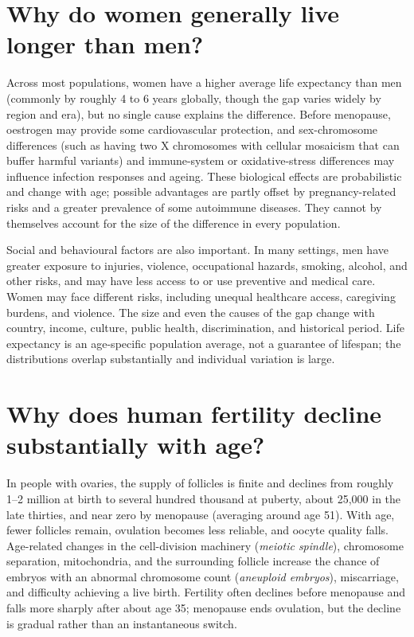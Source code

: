 \documentclass[11pt,oneside]{report}
\begin{document}
\section{Why do women generally live longer than men?}

Across most populations, women have a higher average life expectancy than men
(commonly by roughly 4 to 6 years globally, though the gap varies widely by
region and era), but no single cause explains the difference. Before menopause,
oestrogen may provide some cardiovascular protection, and sex-chromosome
differences (such as having two X chromosomes with cellular mosaicism that can
buffer harmful variants) and immune-system or oxidative-stress differences may
influence infection responses and ageing. These biological
effects are probabilistic and change with age; possible advantages are partly
offset by pregnancy-related risks and a greater prevalence of some autoimmune
diseases. They cannot by themselves account for the size of the difference in
every population.

Social and behavioural factors are also important. In many settings, men have
greater exposure to injuries, violence, occupational hazards, smoking, alcohol,
and other risks, and may have less access to or use preventive and medical care.
Women may face different risks, including unequal healthcare access, caregiving
burdens, and violence. The size and even the causes of the gap change with
country, income, culture, public health, discrimination, and historical
period. Life expectancy is an age-specific population average, not a guarantee
of lifespan; the distributions overlap substantially and individual variation
is large.

\section{Why does human fertility decline substantially with age?}

In people with ovaries, the supply of follicles is finite and declines from
roughly 1--2 million at birth to several hundred thousand at puberty, about
25,000 in the late thirties, and near zero by menopause (averaging around age
51). With age, fewer follicles remain, ovulation becomes less reliable, and
oocyte quality falls. Age-related changes in the cell-division machinery
(\emph{meiotic spindle}), chromosome separation, mitochondria, and the
surrounding follicle increase the chance of embryos with an abnormal chromosome
count (\emph{aneuploid embryos}), miscarriage, and difficulty achieving a live
birth. Fertility often declines before menopause and falls more sharply after
about age 35; menopause ends ovulation, but the decline is gradual rather than
an instantaneous switch.
\end{document}
